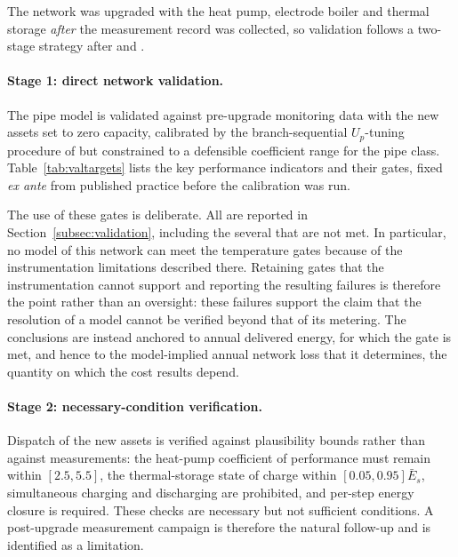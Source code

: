 
The network was upgraded with the heat pump, electrode boiler and thermal storage
\emph{after} the measurement record was collected, so validation follows a two-stage
strategy after \citet{Kus2025} and \citet{Maldonado2024}.

\paragraph{Stage 1: direct network validation.}
The pipe model is validated against pre-upgrade monitoring data with the new assets set to
zero capacity, calibrated by the branch-sequential $U_p$-tuning procedure of
\citet{Maldonado2024} but constrained to a defensible coefficient range
for the pipe class. Table~\ref{tab:valtargets} lists the key performance indicators and
their gates, fixed \emph{ex ante} from published practice before the calibration was run.

The use of these gates is deliberate. All are reported in
Section~\ref{subsec:validation}, including the several that are not met. In particular, no
model of this network can meet the temperature gates because of the instrumentation
limitations described there. Retaining gates that the instrumentation cannot support and
reporting the resulting failures is therefore the point rather than an oversight: these
failures support the claim that the resolution of a model cannot be verified beyond that of
its metering. The conclusions are instead anchored to annual delivered energy, for which the
gate is met, and hence to the model-implied annual network loss that it determines, the
quantity on which the cost results depend.

\paragraph{Stage 2: necessary-condition verification.}
Dispatch of the new assets is verified against plausibility bounds rather than against
measurements: the heat-pump coefficient of performance must remain within \([2.5,5.5]\),
the thermal-storage state of charge within \([0.05,0.95]\bar{E}_s\), simultaneous charging
and discharging are prohibited, and per-step energy closure is required. These checks are
necessary but not sufficient conditions. A post-upgrade measurement campaign is therefore
the natural follow-up and is identified as a limitation.

